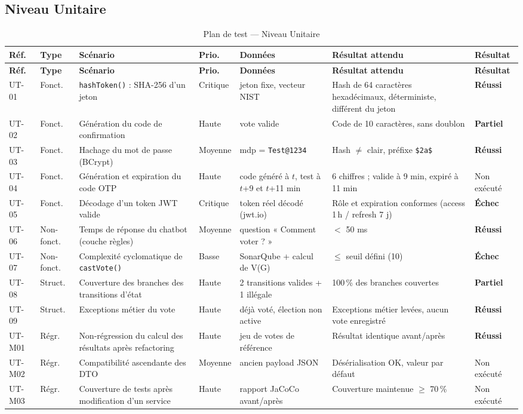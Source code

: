 \documentclass[12pt,a4paper]{report}
\newcommand{\ok}{\textcolor{okgreen}{\textbf{Réussi}}}
\newcommand{\ko}{\textcolor{kored}{\textbf{Échec}}}
\newcommand{\pa}{\textcolor{paorange}{\textbf{Partiel}}}
\newcommand{\nex}{\textcolor{negray}{Non exécuté}}
\newcommand{\planHead}{\rowcolor{evlight}\textbf{Réf.} & \textbf{Type} & \textbf{Scénario} & \textbf{Prio.} & \textbf{Données} & \textbf{Résultat attendu} & \textbf{Résultat}}
\begin{document}
{\footnotesize
\setlength{\tabcolsep}{4pt}
\subsection{Niveau Unitaire}

\begin{longtable}{@{}p{1.45cm}p{1.25cm}p{2.9cm}p{1.15cm}p{2.3cm}p{3.4cm}p{1.6cm}@{}}
\caption{Plan de test --- Niveau Unitaire}\\
\toprule \planHead \\ \midrule \endfirsthead
\toprule \planHead \\ \midrule \endhead
\bottomrule \endlastfoot
UT-01 & Fonct. & \texttt{hashToken()} : SHA-256 d'un jeton & Critique & jeton fixe, vecteur NIST & Hash de 64 caractères hexadécimaux, déterministe, différent du jeton & \ok\\
UT-02 & Fonct. & Génération du code de confirmation & Haute & vote valide & Code de 10 caractères, sans doublon & \pa\\
UT-03 & Fonct. & Hachage du mot de passe (BCrypt) & Moyenne & mdp = \texttt{Test@1234} & Hash $\neq$ clair, préfixe \texttt{\$2a\$} & \ok\\
UT-04 & Fonct. & Génération et expiration du code OTP & Haute & code généré à $t$, test à $t$+9 et $t$+11 min & 6 chiffres ; valide à 9 min, expiré à 11 min & \nex\\
UT-05 & Fonct. & Décodage d'un token JWT valide & Critique & token réel décodé (jwt.io) & Rôle et expiration conformes (access 1\,h / refresh 7 j) & \ko\\
UT-06 & Non-fonct. & Temps de réponse du chatbot (couche règles) & Moyenne & question « Comment voter ? » & $<$ 50 ms & \ok\\
UT-07 & Non-fonct. & Complexité cyclomatique de \texttt{castVote()} & Basse & SonarQube + calcul de V(G) & $\leq$ seuil défini (10) & \ko\\
UT-08 & Struct. & Couverture des branches des transitions d'état & Haute & 2 transitions valides + 1 illégale & 100\,\% des branches couvertes & \pa\\
UT-09 & Struct. & Exceptions métier du vote & Haute & déjà voté, élection non active & Exceptions métier levées, aucun vote enregistré & \ok\\
UT-M01 & Régr. & Non-régression du calcul des résultats après refactoring & Haute & jeu de votes de référence & Résultat identique avant/après & \ok\\
UT-M02 & Régr. & Compatibilité ascendante des DTO & Moyenne & ancien payload JSON & Désérialisation OK, valeur par défaut & \nex\\
UT-M03 & Régr. & Couverture de tests après modification d'un service & Haute & rapport JaCoCo avant/après & Couverture maintenue $\geq$ 70\,\% & \nex\\
\end{longtable}

}
\end{document}
